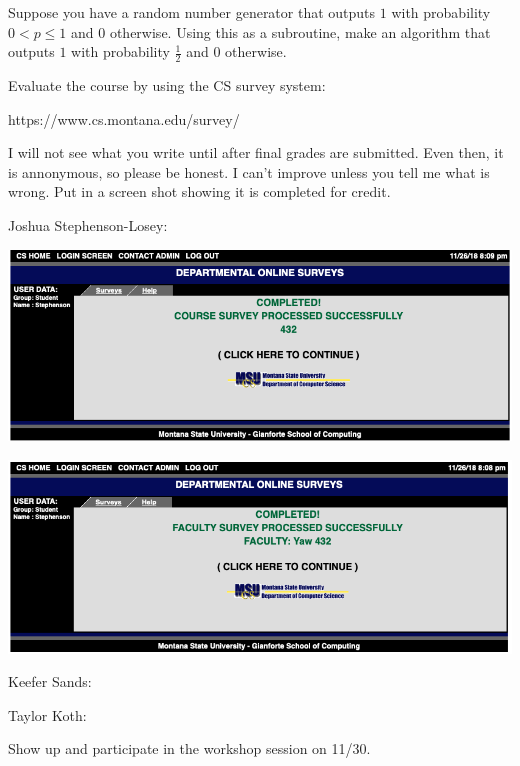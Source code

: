 \documentclass[12pt]{article}
\newenvironment{problem}[2][Problem]
{\begin{trivlist}
\item[\hskip \labelsep {\bfseries #1}\hskip \labelsep {\bfseries #2.}]}{\end{trivlist}}
\begin{document}
\begin{problem}{2}
Suppose you have a random number generator that outputs $1$ with probability $0 < p \le 1$ and $0$ otherwise. Using this as a subroutine, make an algorithm that outputs $1$ with probability $\frac{1}{2}$ and $0$ otherwise.
\end{problem}

\begin{problem}{3*}
Evaluate the course by using the CS survey system: 

https://www.cs.montana.edu/survey/

I will not see what you write until after final grades are submitted. Even then, it is annonymous, so please be honest. I can't improve unless you tell me what is wrong. Put in a screen shot showing it is completed for credit.

Joshua Stephenson-Losey:

\includegraphics[scale = .33]{Surveys/SL_432.png}

\includegraphics[scale = .33]{Surveys/SL_432_yaw.png}

Keefer Sands:

Taylor Koth:


\end{problem}

\begin{problem}{4}
Show up and participate in the workshop session on 11/30.
\end{problem}
 
\end{document}

